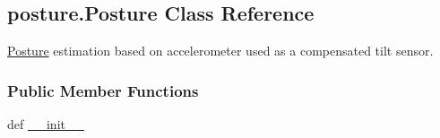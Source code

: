 \hypertarget{classposture_1_1_posture}{\subsection{posture.\-Posture Class Reference}
\label{classposture_1_1_posture}
}


\hyperlink{classposture_1_1_posture}{Posture} estimation based on accelerometer used as a compensated tilt sensor.  


\subsubsection*{Public Member Functions}
\begin{DoxyCompactItemize}
\item 
\hypertarget{classposture_1_1_posture_a83e447c26b71e109493860eb3157c409}{def \hyperlink{classposture_1_1_posture_a83e447c26b71e109493860eb3157c409}{\-\_\-\-\_\-init\-\_\-\-\_\-}}\label{classposture_1_1_posture_a83e447c26b71e109493860eb3157c409}


\end{DoxyCompactItemize}
